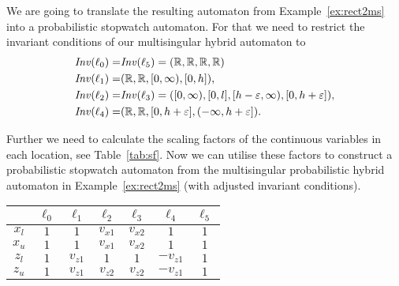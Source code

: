 \begin{ex}
\label{ex:ms2sw}
We are going to translate the resulting automaton from Example~\ref{ex:rect2ms} into a probabilistic stopwatch automaton. For that we need to restrict the invariant conditions of our multisingular hybrid automaton to
\begin{align*}
    \mathit{Inv}(\ell_{0})=&\mathit{Inv}(\ell_{5})=(\mathbb{R},\mathbb{R},\mathbb{R},\mathbb{R})\\
    \mathit{Inv}(\ell_{1})=&(\mathbb{R},\mathbb{R},[0,\infty),[0,h]), \\
    \mathit{Inv}(\ell_{2})=&\mathit{Inv}(\ell_{3})=([0,\infty),[0,l],[h-\varepsilon,\infty),[0,h+\varepsilon]), \\
    \mathit{Inv}(\ell_{4})=& (\mathbb{R},\mathbb{R},[0,h+\varepsilon],(-\infty,h+\varepsilon]).
\end{align*}

Further we need to calculate the scaling factors of the continuous variables in each location, see Table~\ref{tab:sf}. Now we can utilise these factors to construct a probabilistic stopwatch automaton from the multisingular probabilistic hybrid automaton in Example~\ref{ex:rect2ms} (with adjusted invariant conditions).
\begin{table}
\begin{center}
    \begin{tabular}{c|c|c|c|c|c|c}
                & $\ell_{0}$ & $\ell_{1}$ & $\ell_{2}$ & $\ell_{3}$ & $\ell_{4}$ & $\ell_{5}$ \\ \hline
        $x_{l}$ & $1$ & $1$ & $v_{x1}$ & $v_{x2}$ & $1$ & $1$ \\ \hline
        $x_{u}$ & $1$ & $1$ & $v_{x1}$ & $v_{x2}$ & $1$ & $1$ \\ \hline
        $z_{l}$ & $1$ & $v_{z1}$ & $1$ & $1$ & $-v_{z1}$ & $1$ \\ \hline
        $z_{u}$ & $1$ & $v_{z1}$ & $v_{z2}$ & $v_{z2}$ & $-v_{z1}$ & $1$


\end{tabular}
\end{center}
\end{table}
\end{ex}
